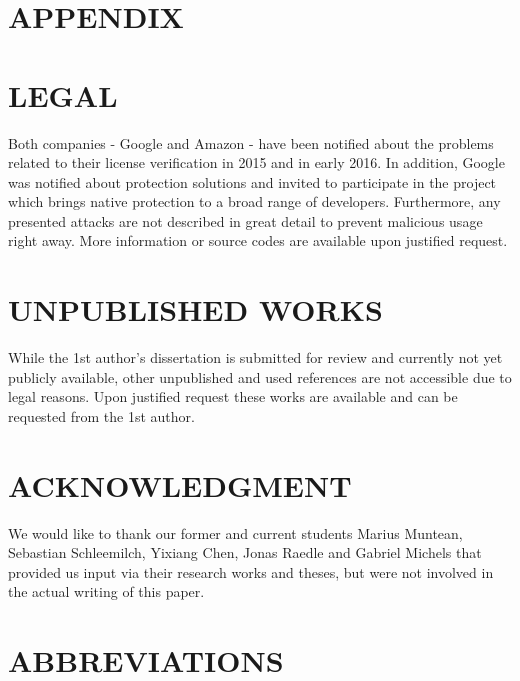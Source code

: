 \documentclass{sig-alternate}
\begin{document}
\section*{APPENDIX}

\section*{LEGAL}

Both companies - Google and Amazon - have been notified about the problems related to their license verification in 2015 and in early 2016. In addition, Google was notified about protection solutions and invited to participate in the project which brings native protection to a broad range of developers. Furthermore, any presented attacks are not described in great detail to prevent malicious usage right away. More information or source codes are available upon justified request. 

\section*{UNPUBLISHED WORKS}

While the 1st author's dissertation is submitted for review and currently not yet publicly available, other unpublished and used references are not accessible due to legal reasons. Upon justified request these works are available and can be requested from the 1st author.

\section*{ACKNOWLEDGMENT}

We would like to thank our former and current students Marius Muntean, Sebastian Schleemilch, Yixiang Chen, Jonas Raedle and Gabriel Michels that provided us input via their research works and theses, but were not involved in the actual writing of this paper. \\


\section*{ABBREVIATIONS}
\begin{acronym}[Bash]

\end{acronym}
\end{document}
